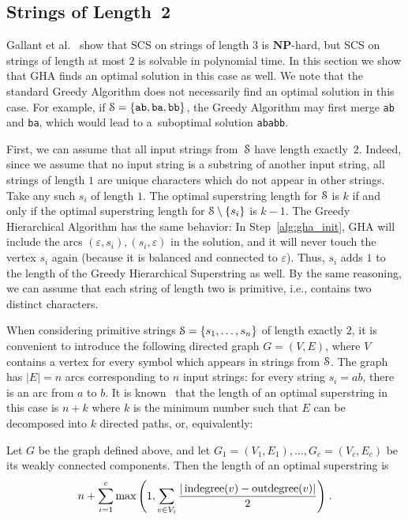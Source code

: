 
\subsection{Strings of Length~2}
Gallant et al.~\cite{GMS1980} show that SCS on strings of length $3$ is $\mathbf{NP}$-hard, but SCS on strings of length at most $2$ is solvable in polynomial time. In this section we show that GHA finds an optimal solution in this case as well. We note that the standard Greedy Algorithm does not necessarily find an optimal solution in this case. For example, if ${\cal S}=\{{\tt ab}, {\tt ba}, {\tt bb}\}$, the Greedy Algorithm may first merge {\tt ab} and {\tt ba}, which would lead to a~suboptimal solution {\tt ababb}. 

First, we can assume that all input strings from~${\cal S}$ have length exactly~$2$. Indeed, since we assume that no input string is a substring of another input string, all strings of length $1$ are unique characters which do not appear in other strings. Take any such $s_i$ of length $1$. The optimal superstring length for ${\cal S}$ is $k$ if and only if the optimal superstring length for ${\cal S}\setminus\{s_i\}$ is $k-1$. The Greedy Hierarchical Algorithm has the same behavior: In Step~\ref{alg:gha_init}, GHA will include the arcs $(\varepsilon, s_i), (s_i, \varepsilon)$ in the solution, and it will never touch the vertex $s_i$ again (because it is balanced and connected to $\varepsilon$). Thus, $s_i$ adds $1$ to the length of the Greedy Hierarchical Superstring as well. By the same reasoning, we can assume that each string of length two is primitive, i.e., contains two distinct characters.

When considering primitive strings ${\cal S}=\{s_1,\ldots,s_n\}$ of length exactly $2$, it is convenient to introduce the following directed graph $G=(V, E)$, where $V$ contains a vertex for every symbol which appears in strings from ${\cal S}$. The graph has $|E|=n$ arcs corresponding to $n$ input strings: for every string $s_i=ab$, there is an arc from $a$ to $b$. It is known~\cite{GMS1980} that the length of an optimal superstring in this case is $n+k$ where $k$ is the minimum number such that $E$ can be decomposed into $k$ directed paths, or, equivalently:
\begin{proposition}
Let $G$ be the graph defined above, and let $G_1=(V_1,E_1),\ldots,G_c=(V_c,E_c)$ be its weakly connected components. Then the length of an optimal superstring is
\begin{align}
\label{eq:gms}
n + \sum_{i=1}^{c} {\max\left( 1, \sum_{v \in V_i}{ \frac{ |\operatorname{indegree}(v) - \operatorname{outdegree}(v)|}{2} }\right)} \; .
\end{align}
\end{proposition}

